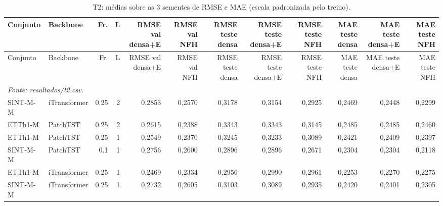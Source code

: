 \tiny
\setlength{\tabcolsep}{2pt}
\begin{longtable}{llrrrrrrrrrr}
\caption{T2: m\'edias sobre as 3 sementes de RMSE e MAE (escala padronizada pelo treino).}\label{tab:t2_abs}\\
\toprule
Conjunto & Backbone & Fr. & L & \shortstack[l]{RMSE val\\ densa+E} & \shortstack[l]{RMSE val\\ NFH} & \shortstack[l]{RMSE teste\\ densa} & \shortstack[l]{RMSE teste\\ densa+E} & \shortstack[l]{RMSE teste\\ NFH} & \shortstack[l]{MAE teste\\ densa} & \shortstack[l]{MAE teste\\ densa+E} & \shortstack[l]{MAE teste\\ NFH} \\ \midrule
\endfirsthead
\toprule
Conjunto & Backbone & Fr. & L & \shortstack[l]{RMSE val\\ densa+E} & \shortstack[l]{RMSE val\\ NFH} & \shortstack[l]{RMSE teste\\ densa} & \shortstack[l]{RMSE teste\\ densa+E} & \shortstack[l]{RMSE teste\\ NFH} & \shortstack[l]{MAE teste\\ densa} & \shortstack[l]{MAE teste\\ densa+E} & \shortstack[l]{MAE teste\\ NFH} \\ \midrule
\endhead
\bottomrule
\multicolumn{12}{l}{\textit{Fonte: resultados/t2.csv.}}\\
\endlastfoot
SINT-M-M & iTransformer & 0.25 & 2 & 0,2853 & 0,2570 & 0,3178 & 0,3154 & 0,2925 & 0,2469 & 0,2448 & 0,2299 \\
ETTh1-M & PatchTST & 0.25 & 2 & 0,2615 & 0,2388 & 0,3343 & 0,3343 & 0,3145 & 0,2485 & 0,2485 & 0,2460 \\
ETTh1-M & PatchTST & 0.25 & 1 & 0,2549 & 0,2370 & 0,3245 & 0,3233 & 0,3089 & 0,2421 & 0,2409 & 0,2397 \\
SINT-M-M & PatchTST & 0.1 & 1 & 0,2756 & 0,2600 & 0,2896 & 0,2896 & 0,2671 & 0,2304 & 0,2304 & 0,2118 \\
ETTh1-M & iTransformer & 0.25 & 1 & 0,2469 & 0,2334 & 0,2956 & 0,2990 & 0,2961 & 0,2253 & 0,2270 & 0,2275 \\
SINT-M-M & iTransformer & 0.25 & 1 & 0,2732 & 0,2605 & 0,3103 & 0,3089 & 0,2935 & 0,2420 & 0,2401 & 0,2305 \\

\end{longtable}
